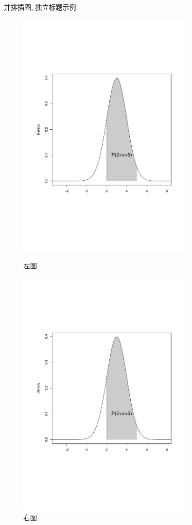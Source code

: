 \documentclass{cosart}
\begin{document}
并排插图, 独立标题示例:
\begin{figure}[htp]
\begin{minipage}[t]{0.5\linewidth}
\centering
\includegraphics[width=0.80\textwidth]{figure.pdf}
\caption{左图} \label{fig:side:a}
\end{minipage}
\begin{minipage}[t]{0.5\linewidth}
\centering
\includegraphics[width=0.80\textwidth]{figure.pdf}
\caption{右图} \label{fig:side:b}
\end{minipage}
\end{figure}
\end{document}
